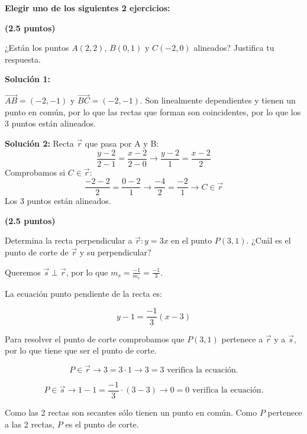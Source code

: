 \documentclass[palatino,noprobframes]{CuartillaSafa}
\renewcommand{\vec}[1]{\overrightarrow{#1}}
\begin{document}

\textbf{Elegir uno de los siguientes 2 ejercicios:}
\begin{problem}\textbf{(2.5 puntos)}

¿Están los puntos $A(2,2)$, $B(0,1)$ y $C(-2,0)$ alineados? Justifica tu respuesta.

\textbf{Solución 1:}

$\vec{AB} = (-2,-1)$ y $\vec{BC} = (-2,-1)$. Son linealmente dependientes y tienen un punto en común, por lo que las rectas que forman son coincidentes, por lo que los 3 puntos están alineados.


\textbf{Solución 2:}
Recta $\vec{r}$ que pasa por A y B: \[
\frac{y-2}{2-1} = \frac{x-2}{2-0} \to \frac{y-2}{1} = \frac{x-2}{2}
\]
Comprobamos si $C\in \vec{r}$: 
\[
	\frac{-2-2}{2} = \frac{0-2}{1} \to \frac{-4}{2} = \frac{-2}{1} \to C\in\vec{r}
\]
Los 3 puntos están alineados.

\end{problem}
\begin{problem}\textbf{(2.5 puntos)}

Determina la recta perpendicular a $\vec{r}: y=3x$ en el punto $P(3,1)$. ¿Cuál es el punto de corte de $\vec{r}$ y su perpendicular?

Queremos $\vec{s}\perp\vec{r}$, por lo que $m_s = \frac{-1}{m_r} = \frac{-1}{3}$.

La ecuación punto pendiente de la recta es:

\[
	y-1 = \frac{-1}{3}(x-3)
\]

Para resolver el punto de corte comprobamos que $P(3,1)$ pertenece a $\vec{r}$ y a $\vec{s}$, por lo que tiene que ser el punto de corte.

\[
P\in\vec{r} \to 3 = 3·1 \to 3=3 \text{ verifica la ecuación.}
\]

\[
P\in\vec{s} \to 1-1 = \frac{-1}{3}·(3-3) \to 0=0 \text{ verifica la ecuación.}
\]

Como las 2 rectas son secantes sólo tienen un punto en común. Como $P$ pertenece a las 2 rectas, $P$ es el punto de corte.

\end{problem}






\end{document}

